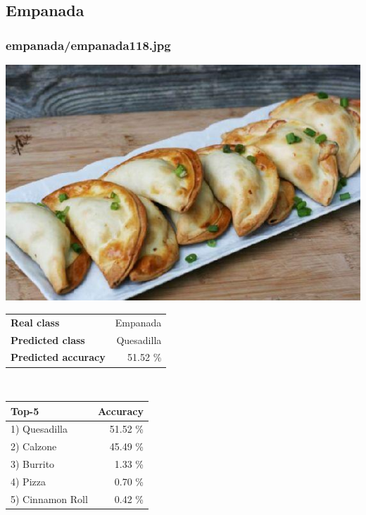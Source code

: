 \subsection{Empanada}
    
\subsubsection{empanada/empanada118.jpg}

\begin{minipage}[t]{0.4\textwidth}
	\vspace{0pt}
	\includegraphics[width=\linewidth]{images/evaluation-images/empanada/empanada118.jpg}
\end{minipage}
\hfill
\begin{minipage}[t]{0.5\textwidth}
	\vspace{0pt}\raggedright
	\begin{tabularx}{\textwidth}{X r}
		\small \textbf{Real class} & \small Empanada\\
		\small \textbf{Predicted class} & \small Quesadilla\\
		\small \textbf{Predicted accuracy} & \small 51.52 \%
    \end{tabularx}\\
    
    \vspace{6pt}
	\begin{tabularx}{\textwidth}{X r}
        \small \textbf{Top-5} & \small \textbf{Accuracy} \\
        \hline
		\small 1) Quesadilla & \small 51.52 \%\\\small 2) Calzone & \small 45.49 \%\\\small 3) Burrito & \small 1.33 \%\\\small 4) Pizza & \small 0.70 \%\\\small 5) Cinnamon Roll & \small 0.42 \%
    \end{tabularx}
\end{minipage}
    
